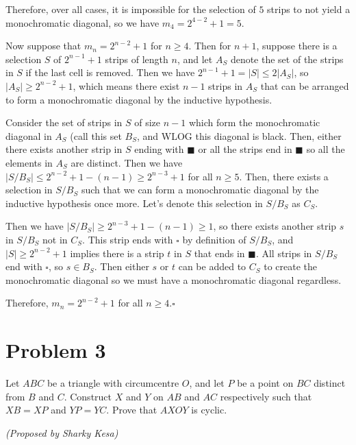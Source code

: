 \documentclass[10pt]{article}
\newcommand{\ws}{\square}
\newcommand{\bs}{\blacksquare}
\begin{document}
	Therefore, over all cases, it is impossible for the selection of $5$ strips to not yield a monochromatic diagonal, so we have $m_4 = 2^{4-2} + 1 = 5$.
	
	Now suppose that \(m_n = 2^{n-2}+1\) for \(n \geq 4\). Then for $n+1$, suppose there is a selection $S$ of $2^{n-1} + 1$ strips of length $n$, and let $A_S$ denote the set of the strips in $S$ if the last cell is removed. Then we have $2^{n-1} + 1 = |S| \leq 2|A_S|$, so $|A_S| \geq 2^{n-2} + 1$, which means there exist $n-1$ strips in $A_S$ that can be arranged to form a monochromatic diagonal by the inductive hypothesis. 
	
	Consider the set of strips in $S$ of size $n-1$ which form the monochromatic diagonal in $A_S$ (call this set $B_S$, and WLOG this diagonal is black. Then, either there exists another strip in $S$ ending with \(\bs\) or all the strips end in \(\bs\) so all the elements in $A_S$ are distinct. Then we have $\left \lvert S / B_S \right \rvert \leq 2^{n - 2} + 1 - (n - 1) \geq 2^{n - 3} + 1$ for all $n \geq 5$. Then, there exists a selection in $S / B_S$ such that we can form a monochromatic diagonal by the inductive hypothesis once more. Let's denote this selection in $S / B_S$ as $C_S$. 
	
	Then we have $|S / B_S| \geq 2^{n-3} + 1 - (n - 1) \geq 1$, so there exists another strip $s$ in $S / B_S$ not in $C_S$. This strip ends with \(\ws\) by definition of $S / B_S$, and $|S| \geq 2^{n-2} + 1$ implies there is a strip $t$ in $S$ that ends in \(\bs\). All strips in $S / B_S$ end with \(\ws\), so $s \in B_S$. Then either $s$ or $t$ can be added to $C_S$ to create the monochromatic diagonal so we must have a monochromatic diagonal regardless.
	
	Therefore, $m_n = 2^{n-2} + 1$ for all $n \geq 4$.\hfill\ensuremath{\square}\\
	
	\newpage
	
	\section*{Problem 3}
	
	Let \(ABC\) be a triangle with circumcentre \(O\), and let \(P\) be a point on \(BC\) distinct from \(B\) and \(C\). Construct \(X\) and \(Y\) on \(AB\) and \(AC\) respectively such that \(XB = XP\) and \(YP = YC\). Prove that \(AXOY\) is cyclic.
	\begin{flushright}
	\textit{(Proposed by Sharky Kesa)}
	\end{flushright}
	
\end{document}
